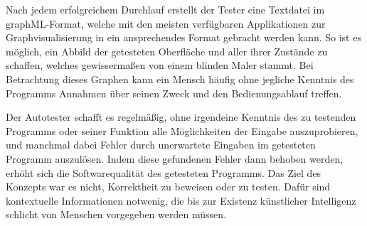 Nach jedem erfolgreichem Durchlauf erstellt der Tester
eine Textdatei im graphML-Format, welche mit den meisten
verfügbaren Applikationen zur Graphvisualisierung in ein
ansprechendes Format gebracht werden kann. So ist es möglich,
ein Abbild der getesteten Oberfläche und aller ihrer Zustände 
zu schaffen, welches gewissermaßen von einem blinden Maler stammt.
Bei Betrachtung dieses Graphen kann ein Mensch häufig
ohne jegliche Kenntnis des Programms Annahmen über seinen Zweck
und den Bedienungsablauf treffen.

Der Autotester schafft es regelmäßig, ohne irgendeine Kenntnis des zu
testenden Programms oder seiner Funktion alle Möglichkeiten
der Eingabe auszuprobieren, und manchmal dabei Fehler durch unerwartete
Eingaben im getesteten Programm auszulösen.
Indem diese gefundenen Fehler dann behoben werden, erhöht sich die
Softwarequalität des getesteten Programms. Das Ziel des Konzepts
war es nicht, Korrektheit zu beweisen oder zu testen. Dafür
sind kontextuelle Informationen notwenig, die bis zur Existenz
künstlicher Intelligenz schlicht von Menschen vorgegeben werden müssen.
